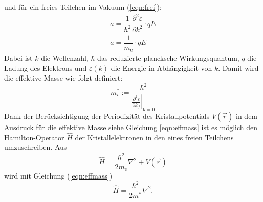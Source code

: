  und für ein freies Teilchen im Vakuum (\ref{eqn:frei}):
\begin{align}
  \label{eqn:kris}
  a=\dfrac{1}{\hbar^2}\dfrac{\partial^2 \varepsilon}{\partial k^2}\cdot qE \\
  \label{eqn:frei}
  a=\dfrac{1}{m_\mathrm{e}}\cdot qE
\end{align}
Dabei ist $k$ die Wellenzahl, $\hbar$ das reduzierte plancksche Wirkungsquantum, $q$ die Ladung des Elektrons und $\varepsilon(k)$ die Energie in Abhängigkeit von $k$.
Damit wird die effektive Masse wie folgt definiert:
\begin{equation}
  \label{eqn:effmass}
  m^{*}_i := \frac{\hbar^2}{\left.\frac{\partial^2 \varepsilon}{\partial k_\mathrm{i^2}}\right|_\mathrm{k=0}}
\end{equation}
Dank der Berücksichtigung der Periodizität des Kristallpotentials $V(\vec{r})$ in dem Ausdruck für die effektive Masse siehe Gleichung \ref{eqn:effmass} ist es möglich den Hamilton-Operator $\hat{H}$ der Kristallelektronen in den
eines freien Teilchens umzuschreiben. Aus
\begin{equation*}
  \hat{H}=\dfrac{\hbar^2}{2m_\mathrm{e}}\nabla^2+V(\vec{r})
\end{equation*}
wird mit Gleichung (\ref{eqn:effmass})
\begin{equation*}
  \hat{H}=\dfrac{\hbar^2}{2m^*}\nabla^2 .
\end{equation*}
